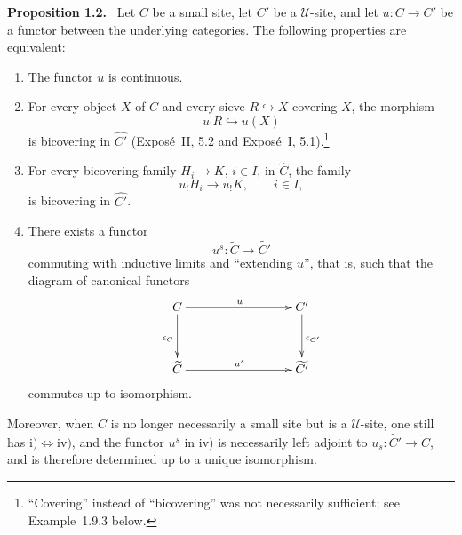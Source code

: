 \documentclass[11pt]{article}
\newcommand{\U}{\mathcal{U}}
\newenvironment{statement}[1]{\par\medskip\noindent\textbf{#1.}\ }{\par\medskip}
\begin{document}
\begin{statement}{Proposition 1.2}
Let \(C\) be a small site, let \(C'\) be a \(\U\)-site, and let \(u:C\to C'\) be a functor between the underlying categories. The following properties are equivalent:
\begin{enumerate}[label=\roman*)]
\item The functor \(u\) is continuous.

\item For every object \(X\) of \(C\) and every sieve \(R\hookrightarrow X\) covering \(X\), the morphism
\[
u_!R\hookrightarrow u(X)
\]
is bicov\-ering in \(\widehat{C'}\) (Expos\'e~II, 5.2 and Expos\'e~I, 5.1).\footnote{``Covering'' instead of ``bicov\-ering'' was not necessarily sufficient; see Example~1.9.3 below.}

\item For every bicov\-ering family \(H_i\to K\), \(i\in I\), in \(\widehat C\), the family
\[
u_!H_i\to u_!K,\qquad i\in I,
\]
is bicov\-ering in \(\widehat{C'}\).

\item There exists a functor
\[
u^s:\widetilde C\to\widetilde{C'}
\]
commuting with inductive limits and ``extending \(u\)'', that is, such that the diagram of canonical functors
\[
\xymatrix@C=3cm@R=1.25cm{
  C \ar[r]^{u} \ar[d]_{\epsilon_C} & C' \ar[d]^{\epsilon_{C'}}\\
\widetilde C \ar[r]^{u^s}& \widetilde{C'}
}
\]
commutes up to isomorphism.
\end{enumerate}
Moreover, when \(C\) is no longer necessarily a small site but is a \(\U\)-site, one still has \(\mathrm{i)}\Leftrightarrow\mathrm{iv)}\), and the functor \(u^s\) in \(\mathrm{iv)}\) is necessarily left adjoint to \(u_s:\widetilde{C'}\to\widetilde C\), and is therefore determined up to a unique isomorphism.
\end{statement}
\end{document}
